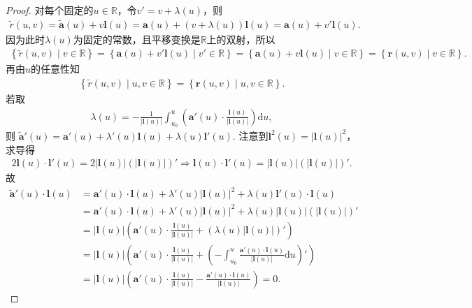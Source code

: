 \documentclass[../../main.tex]{subfiles}%
\begin{document}
\begin{proof}
对每个固定的$u\in\mathbb{R}$，令$v'=v+\lambda(u)$，则\begin{align*}
\tilde{r}(u,v)=\tilde{\bm{a}}(u)+v\bm{l}(u)=\bm{a}(u)+(v+\lambda(u))\bm{l}(u)=\bm{a}(u)+v'\bm{l}(u).
\end{align*}
因为此时$\lambda(u)$为固定的常数，且平移变换是$\mathbb{R}$上的双射，所以\begin{align*}
\left\{ \tilde{r}(u,v) \mid v\in\mathbb{R} \right\}=\left\{ \bm{a}(u)+v'\bm{l}(u) \mid v'\in\mathbb{R} \right\}=\left\{ \bm{a}(u)+v\bm{l}(u) \mid v\in\mathbb{R} \right\}=\left\{ \bm{r}(u,v) \mid v\in\mathbb{R} \right\}.
\end{align*}
再由$u$的任意性知\begin{align*}
\left\{ \tilde{r}(u,v) \mid u,v\in\mathbb{R} \right\}=\left\{ \bm{r}(u,v) \mid u,v\in\mathbb{R} \right\}.
\end{align*}
若取
\begin{align*}
\lambda(u)=-\frac{1}{|\bm{l}(u)|}\int_{u_0}^{u}\left(\bm{a}'(u)\cdot\frac{\bm{l}(u)}{|\bm{l}(u)|}\right)\mathrm{d}u,
\end{align*}
则
$\tilde{\bm{a}}'(u)=\bm{a}'(u)+\lambda'(u)\bm{l}(u)+\lambda(u)\bm{l}'(u).$
注意到$\bm{l}^2(u)=|\bm{l}(u)|^2$，求导得
\begin{align*}
2\bm{l}(u)\cdot\bm{l}'(u)=2|\bm{l}(u)|\left(|\bm{l}(u)|\right)'
\Longrightarrow
\bm{l}(u)\cdot\bm{l}'(u)=|\bm{l}(u)|\left(|\bm{l}(u)|\right)'.
\end{align*}
故\begin{align*}
\tilde{\bm{a}}'(u)\cdot\bm{l}(u)
&=\bm{a}'(u)\cdot\bm{l}(u)+\lambda'(u)|\bm{l}(u)|^2+\lambda(u)\bm{l}'(u)\cdot\bm{l}(u) \\
&=\bm{a}'(u)\cdot\bm{l}(u)+\lambda'(u)|\bm{l}(u)|^2+\lambda(u)|\bm{l}(u)|\left(|\bm{l}(u)|\right)' \\
&=|\bm{l}(u)|\left( \bm{a}'(u)\cdot\frac{\bm{l}(u)}{|\bm{l}(u)|}+\left( \lambda(u)|\bm{l}(u)| \right)' \right) \\
&=|\bm{l}(u)|\left( \bm{a}'(u)\cdot\frac{\bm{l}(u)}{|\bm{l}(u)|}+\left( -\int_{u_0}^u \frac{\bm{a}'(u)\cdot\bm{l}(u)}{|\bm{l}(u)|}\mathrm{d}u \right)' \right) \\
&=|\bm{l}(u)|\left( \bm{a}'(u)\cdot\frac{\bm{l}(u)}{|\bm{l}(u)|}-\frac{\bm{a}'(u)\cdot\bm{l}(u)}{|\bm{l}(u)|} \right) =0.
\end{align*}
\end{proof}
\end{document}
